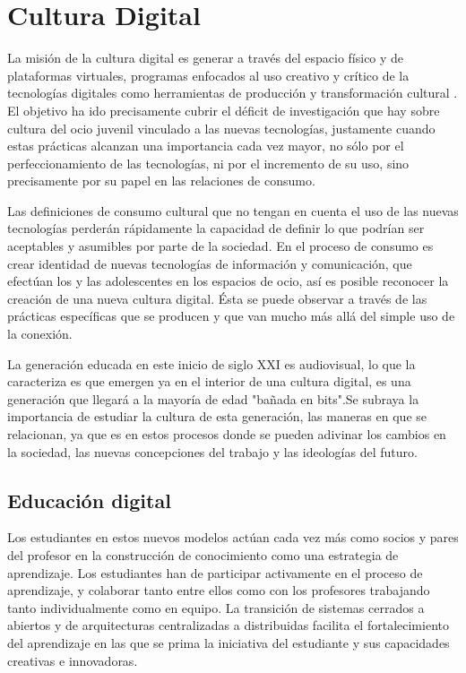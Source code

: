 \section{Cultura Digital}
La misión de la cultura digital es generar a través del espacio físico y de plataformas virtuales, programas enfocados al uso creativo y crítico de la tecnologías digitales como herramientas de producción y transformación cultural \cite{vid08}. El objetivo ha ido precisamente cubrir el déficit de investigación que hay sobre cultura del ocio juvenil vinculado a las nuevas tecnologías, justamente cuando estas prácticas alcanzan una importancia cada vez mayor, no sólo por el perfeccionamiento de las tecnologías, ni por el incremento de su uso, sino precisamente por su papel en las relaciones de consumo. 

Las definiciones de consumo cultural que no tengan en cuenta el uso de las nuevas tecnologías perderán rápidamente la capacidad de definir lo que podrían ser aceptables y asumibles por parte de la sociedad. En el proceso de consumo es crear identidad de nuevas tecnologías de información y comunicación, que efectúan los y las adolescentes en los espacios de ocio, así es posible reconocer la creación de una nueva cultura digital. Ésta se puede observar a través de las prácticas específicas que se producen y que van mucho más allá del simple uso de la conexión.

La generación educada en este inicio de siglo XXI es audiovisual, lo que la caracteriza es que emergen ya en el interior de una cultura digital, es una generación que llegará a la mayoría de edad "bañada en bits".Se subraya la importancia de estudiar la cultura de esta generación, las maneras en que se relacionan, ya que es en estos procesos donde se pueden adivinar los cambios en la sociedad, las nuevas concepciones del trabajo y las ideologías del futuro.

\subsection{Educación digital}
Los estudiantes en estos nuevos modelos actúan cada vez más como socios y pares del profesor en la construcción de conocimiento como una estrategia de aprendizaje. Los estudiantes han de participar activamente en el proceso de aprendizaje, y colaborar tanto entre ellos como con los profesores trabajando tanto individualmente como en equipo. La transición de sistemas cerrados a abiertos y de arquitecturas centralizadas a distribuidas facilita el fortalecimiento del aprendizaje en las que se prima la iniciativa del estudiante y sus capacidades creativas e innovadoras. 

